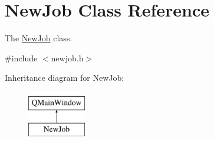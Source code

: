 \hypertarget{class_new_job}{}\section{New\+Job Class Reference}
\label{class_new_job}


The \hyperlink{class_new_job}{New\+Job} class.  




{\ttfamily \#include $<$newjob.\+h$>$}

Inheritance diagram for New\+Job\+:\begin{figure}[H]
\begin{center}
\leavevmode
\includegraphics[height=2.000000cm]{class_new_job}
\end{center}
\end{figure}
